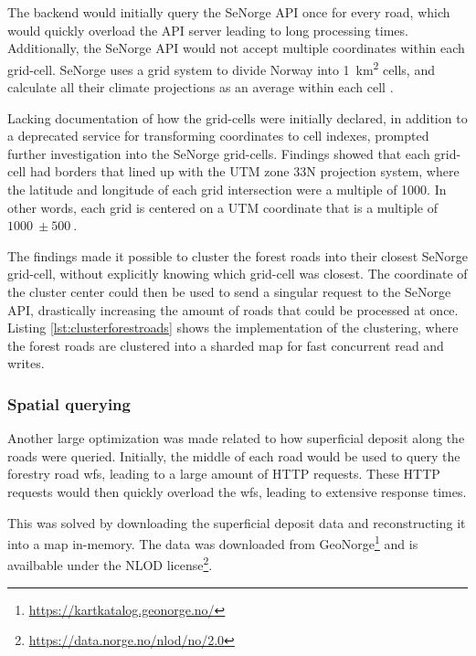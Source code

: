 The backend would initially query the SeNorge API once for every road, which would quickly overload the API server leading to long processing times. Additionally, the SeNorge API would not accept multiple coordinates within each grid-cell. SeNorge uses a grid system to divide Norway into \qty{1}{\kilo\meter\squared} cells, and calculate all their climate projections as an average within each cell \cite{senorge_watermap}. 

Lacking documentation of how the grid-cells were initially declared, in addition to a deprecated service for transforming coordinates to cell indexes, prompted further investigation into the SeNorge grid-cells. Findings showed that each grid-cell had borders that lined up with the UTM zone 33N projection system, where the latitude and longitude of each grid intersection were a multiple of \qty{1000}{}. In other words, each grid is centered on a UTM coordinate that is a multiple of $\qty{1000}{}\pm\qty{500}{}$.

The findings made it possible to cluster the forest roads into their closest SeNorge grid-cell, without explicitly knowing which grid-cell was closest. The coordinate of the cluster center could then be used to send a singular request to the SeNorge API, drastically increasing the amount of roads that could be processed at once. Listing \ref{lst:clusterforestroads} shows the implementation of the clustering, where the forest roads are clustered into a sharded map for fast concurrent read and writes.

\begin{figure}[h]

\end{figure}

\subsubsection{Spatial querying}

Another large optimization was made related to how superficial deposit along the roads were queried. Initially, the middle of each road would be used to query the forestry road \Gls{wfs}, leading to a large amount of HTTP requests. These HTTP requests would then quickly overload the \Gls{wfs}, leading to extensive response times.

This was solved by downloading the superficial deposit data and reconstructing it into a map in-memory. The data was downloaded from GeoNorge\footnote{\url{https://kartkatalog.geonorge.no/}} and is availbable under the NLOD license\footnote{\url{https://data.norge.no/nlod/no/2.0}}. 

